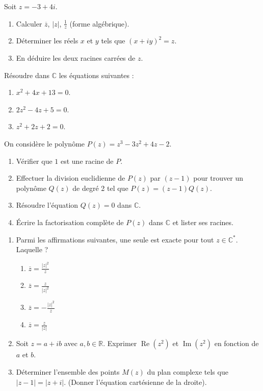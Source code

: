 \documentclass[11pt]{article}
\begin{document}
\begin{exercice}
Soit $z = -3 + 4i$.
\begin{enumerate}
    \item Calculer $\overline{z}$, $|z|$, $\frac{1}{z}$ (forme algébrique).
    \item Déterminer les réels $x$ et $y$ tels que $(x+iy)^2 = z$.
    \item En déduire les deux racines carrées de $z$.
\end{enumerate}
\end{exercice}

\begin{exercice}
Résoudre dans $\mathbb{C}$ les équations suivantes :
\begin{enumerate}
    \item $x^2 + 4x + 13 = 0$.
    \item $2z^2 - 4z + 5 = 0$.
    \item $z^2 + 2z + 2 = 0$.
\end{enumerate}
\end{exercice}

\begin{exercice}
On considère le polynôme $P(z) = z^3 - 3z^2 + 4z - 2$.
\begin{enumerate}
    \item Vérifier que $1$ est une racine de $P$.
    \item Effectuer la division euclidienne de $P(z)$ par $(z-1)$ pour trouver un polynôme $Q(z)$ de degré 2 tel que $P(z) = (z-1)Q(z)$.
    \item Résoudre l'équation $Q(z) = 0$ dans $\mathbb{C}$.
    \item Écrire la factorisation complète de $P(z)$ dans $\mathbb{C}$ et lister ses racines.
\end{enumerate}
\end{exercice}

\begin{exercice}
\begin{enumerate}
    \item Parmi les affirmations suivantes, une seule est exacte pour tout $z \in \mathbb{C}^*$. Laquelle ?
    \begin{enumerate}
        \item $\overline{z} = \frac{|z|^2}{z}$
        \item $\overline{z} = \frac{z}{|z|^2}$
        \item $\overline{z} = -\frac{|z|^2}{z}$
        \item $\overline{z} = \frac{z}{|z|}$
    \end{enumerate}
    \item Soit $z = a+ib$ avec $a,b \in \mathbb{R}$. Exprimer $\operatorname{Re}(z^2)$ et $\operatorname{Im}(z^2)$ en fonction de $a$ et $b$.
    \item Déterminer l'ensemble des points $M(z)$ du plan complexe tels que $|z-1| = |z+i|$. (Donner l'équation cartésienne de la droite).
\end{enumerate}
\end{exercice}
\end{document}
